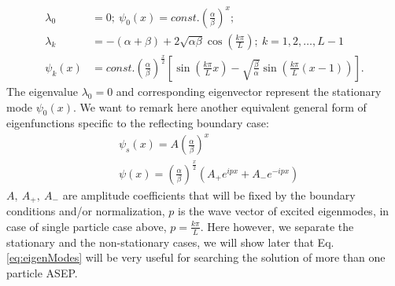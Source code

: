 \documentclass[12pt,a4paper]{article}
\begin{document}
\begin{equation}
    \label{eq:single-particle-eigenmodes}
    \begin{aligned}
        \lambda_0 & = 0; 
        ~\psi_0(x) = const. \left(\frac{\alpha}{\beta}\right)^{x}; \\
        \lambda_k & = -(\alpha+\beta) +
        2\sqrt{\alpha\beta}\cos(\frac{k\pi}{L}); 
        ~k=1,2,\dots, L-1 \\
        \psi_k(x) & = const. \left(\frac{\alpha}{\beta}\right)^{\frac{x}{2}}
            \left[\sin\left(\frac{k\pi}{L}x\right) -
                \sqrt{\frac{\beta}{\alpha}}\sin\left(\frac{k\pi}{L}(x-1)\right)\right].
    \end{aligned}
\end{equation}
The eigenvalue $\lambda_0 = 0$ and corresponding eigenvector represent the
stationary mode $\psi_0(x)$. We want to remark here another equivalent general
form of eigenfunctions specific to the reflecting boundary case:
\begin{subequations}
    \label{eq:eigenModes}
\begin{eqnarray}
    \label{eq:stationaryEigenMode}
    &\psi_s(x)  =  A\left(\frac{\alpha}{\beta}\right)^x \\
    \label{eq:nonstationaryEigenModes}
    &\psi(x)  =  \left(\frac{\alpha}{\beta}\right)^{\frac{x}{2}}
    \left(A_+ e^{ipx} +  A_-e^{-ipx}\right) 
\end{eqnarray}
\end{subequations}
$A,~A_+,~A_-$ are amplitude coefficients that will be fixed by the
boundary conditions and/or normalization, $p$ is the wave vector of excited
eigenmodes, in case of single particle case above, $p=\frac{k\pi}{L}$.
Here however, we separate the stationary and the non-stationary cases, we will
show later that Eq. \eqref{eq:eigenModes} will be very useful for searching the
solution of more than one particle ASEP.
\end{document}
